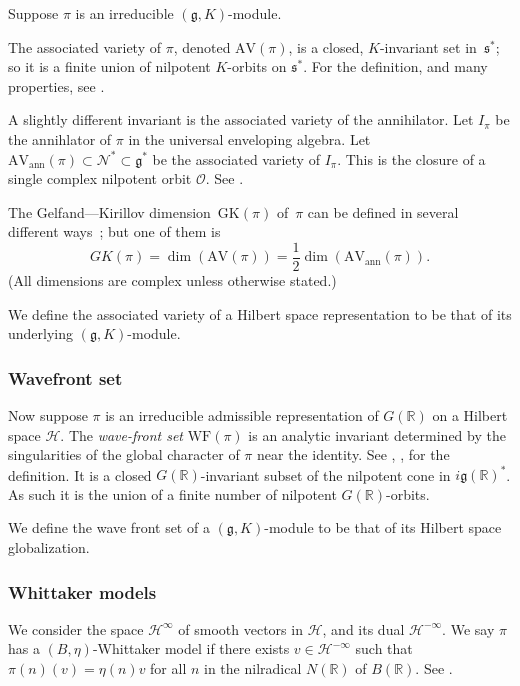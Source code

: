 \documentclass[10pt,leqno]{article}
\newcommand{\mH}{\mathcal H}
\renewcommand{\O}{\mathcal O}
\newcommand{\R}{\mathbb R}
\newcommand{\N}{\mathcal N}
\newcommand{\g}{\mathfrak g}
\newcommand{\s}{\mathfrak s}
\newcommand{\AV}{\mathrm{AV}}
\newcommand{\WF}{\mathrm{WF}}
\newcommand{\AVann}{\mathrm{AV}_{\mathrm{ann}}}
\newcommand{\GK}{\mathrm{GK}}
\begin{document}
Suppose $\pi$ is an irreducible $(\g,K)$-module.

The associated variety of $\pi$, denoted $\AV(\pi)$, is a closed, $K$-invariant set in~$\s^*$; so it is a finite union of
nilpotent $K$-orbits on $\s^*$. For the definition, and many properties, see \cite[Section 5]{vogan_bowdoin}. 


A slightly different invariant is the associated variety of the annihilator. Let $I_\pi$ be the annihlator of $\pi$ in the universal enveloping algebra.
Let $\AVann(\pi)\subset\N^*\subset \g^*$ be the associated variety of $I_\pi$.
This is the closure of a single complex nilpotent orbit $\O$.
See \cite[Section 1, Theorem 4.7]{vogan_bowdoin}.

The Gelfand---Kirillov dimension~$\GK(\pi)$ of~$\pi$ can be defined in several different ways~\cite{vogan-gelfand-kirillov}; but one of them is
$$
GK(\pi)=\dim(\AV(\pi))=\frac12\dim(\AVann(\pi)).
$$
(All dimensions are complex unless otherwise stated.)


We define the associated variety of a Hilbert space representation to be that of  its underlying $(\g,K)$-module.


\subsubsection*{Wavefront set}

Now suppose $\pi$ is an irreducible admissible representation of $G(\R)$ on a Hilbert space $\mH$. 
The \emph{wave-front
  set} $\WF(\pi)$ is an analytic invariant determined by the
singularities of the global character of $\pi$ near the identity. See \cite{howe_wave_front}, \cite{bv_local_structure},
\cite{HarrisHeOlafsson} for the definition. 
It is a closed $G(\R)$-invariant subset of the nilpotent cone in
$i\g(\R)^*$. As such it is the union of a finite number of nilpotent $G(\R)$-orbits.

We define the wave front set of a $(\g,K)$-module to be that of its 
Hilbert space globalization.

\subsubsection*{Whittaker models}

We consider the space $\mH^\infty$ of smooth vectors in $\mH$, and its dual $\mH^{-\infty}$. We say $\pi$ has a $(B,\eta)$-Whittaker model
if there exists $v\in \mH^{-\infty}$ such that $\pi(n)(v)=\eta(n)v$ for all $n$ in the nilradical $N(\R)$ of $B(\R)$.
See \cite{matumoto}. 
\end{document}
